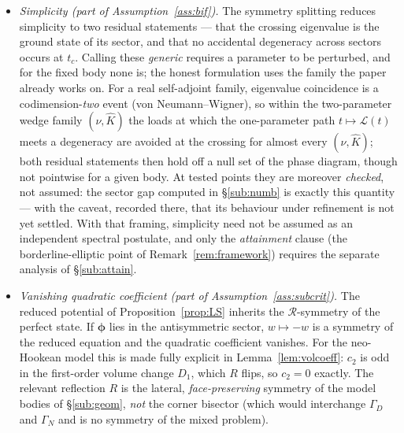 \begin{itemize}
    \item \emph{Simplicity (part of Assumption~\ref{ass:bif}).} The symmetry splitting reduces simplicity to two
          residual statements --- that the crossing eigenvalue is the ground state of its sector, and that no
          accidental degeneracy across sectors occurs at $t_c$. Calling these \emph{generic} requires a parameter to
          be perturbed, and for the fixed body none is; the honest formulation uses the family the paper already
          works on. For a real self-adjoint family, eigenvalue coincidence is a codimension-\emph{two} event
          (von Neumann--Wigner), so within the two-parameter wedge family $(\nu,\hat K)$ the loads at which the
          one-parameter path $t\mapsto\mathcal{L}(t)$ meets a degeneracy are avoided at the crossing for almost every
          $(\nu,\hat K)$; both residual statements then hold off a null set of the phase diagram, though not
          pointwise for a given body. At tested points they are moreover \emph{checked}, not assumed: the sector gap
          computed in \S\ref{sub:numb} is exactly this quantity --- with the caveat, recorded there, that its
          behaviour under refinement is not yet settled. With that framing, simplicity need not be assumed as an
          independent spectral postulate, and only the \emph{attainment} clause (the borderline-elliptic point of
          Remark~\ref{rem:framework}) requires the separate analysis of \S\ref{sub:attain}.
    \item \emph{Vanishing quadratic coefficient (part of Assumption~\ref{ass:subcrit}).} The reduced potential of
          Proposition~\ref{prop:LS} inherits the $\mathcal{R}$-symmetry of the perfect state. If $\bm{\phi}$ lies in the
          antisymmetric sector, $w\mapsto-w$ is a symmetry of the reduced equation and the quadratic coefficient
          vanishes. For the neo-Hookean model this is made fully explicit in Lemma~\ref{lem:volcoeff}: $c_2$ is odd in
          the first-order volume change $D_1$, which $R$ flips, so $c_2=0$ exactly. The relevant reflection $R$ is the
          lateral, \emph{face-preserving} symmetry of the model bodies of \S\ref{sub:geom}, \emph{not} the corner
          bisector (which would interchange $\Gamma_D$ and $\Gamma_N$ and is no symmetry of the mixed problem).
\end{itemize}

